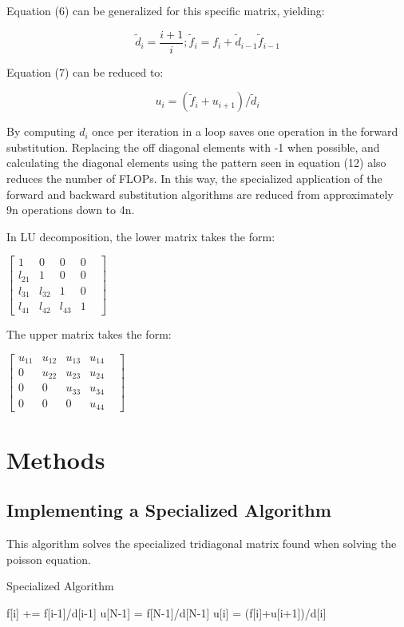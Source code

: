 \documentclass[10pt,showpacs,preprintnumbers,footinbib,amsmath,amssymb,aps,prl,twocolumn,groupedaddress,superscriptaddress,showkeys]{revtex4-1}
\begin{document}
Equation (6) can be generalized for this specific matrix, yielding: 

	\begin{equation}
	\tilde{d}_{i}=\frac{i+1}{i};  
	\tilde{f}_{i}=f_{i}+{\tilde{d}_{i-1}}\tilde{f}_{i-1}
	\end{equation}

Equation (7) can be reduced to:

	\begin{equation}
	u_{i} = (\tilde{f}_{i}+u_{i+1})/\tilde{d}_{i}
	\label{backward}
	\end{equation}

By computing $d_{i}$ once per iteration in a loop saves one operation in the forward substitution. Replacing the off diagonal elements with -1 when possible, and calculating the diagonal elements using the pattern seen in equation (12) also reduces the number of FLOPs. In this way, the specialized application of the forward and backward substitution algorithms are reduced from approximately 9n operations down to 4n.

In LU decomposition, the lower matrix takes the form:
\begin{center}
$\begin{bmatrix}

			1 & 0 & 0 & 0 \\
			l_{21} & 1 & 0 & 0 & \\
			l_{31} &l_{32}& 1 & 0   \\
			l_{41}&l_{42}&l_{43}& 1 
\end{bmatrix}$
\end{center}
The upper matrix takes the form:
\begin{center}
$\begin{bmatrix}
			u_{11}&u_{12}&u_{13}&u_{14}\\
			0 & u_{22} & u_{23}& u_{24} & \\
			0 & 0 & u_{33} & u_{34}   \\
			0 & 0 & 0 & u_{44}
\end{bmatrix}$
\end{center}
\section{Methods}

        \subsection{Implementing a Specialized Algorithm}
This algorithm solves the specialized tridiagonal matrix found when solving the poisson equation.
\begin{algorithm}
\caption{Specialized Algorithm}\label{euclid}
\begin{algorithmic}[1]
\Procedure{}{}
\State f[i] += f[i-1]/d[i-1]
\EndFor
\State u[N-1] = f[N-1]/d[N-1]
\State u[i] = (f[i]+u[i+1])/d[i]
\EndFor
\EndProcedure
\end{algorithmic}
\end{algorithm}
\end{document}
